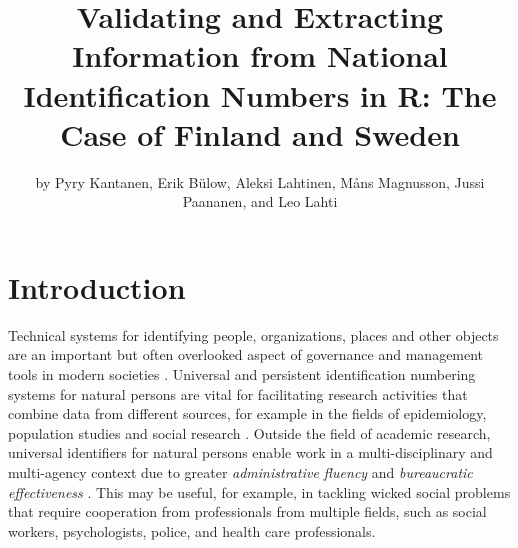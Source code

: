\title{Validating and Extracting Information from National Identification Numbers in R: The Case of Finland and Sweden}


\author{by Pyry Kantanen, Erik Bülow, Aleksi Lahtinen, Måns Magnusson, Jussi Paananen, and Leo Lahti}

\maketitle


\section{Introduction}\label{introduction}

Technical systems for identifying people, organizations, places and other objects are an important but often overlooked aspect of governance and management tools in modern societies \citep{dodge2005}. Universal and persistent identification numbering systems for natural persons are vital for facilitating research activities that combine data from different sources, for example in the fields of epidemiology, population studies and social research \citep{gissler2004}. Outside the field of academic research, universal identifiers for natural persons enable work in a multi-disciplinary and multi-agency context due to greater \emph{administrative fluency} and \emph{bureaucratic effectiveness} \citep{alastalo2022}. This may be useful, for example, in tackling wicked social problems that require cooperation from professionals from multiple fields, such as social workers, psychologists, police, and health care professionals.

